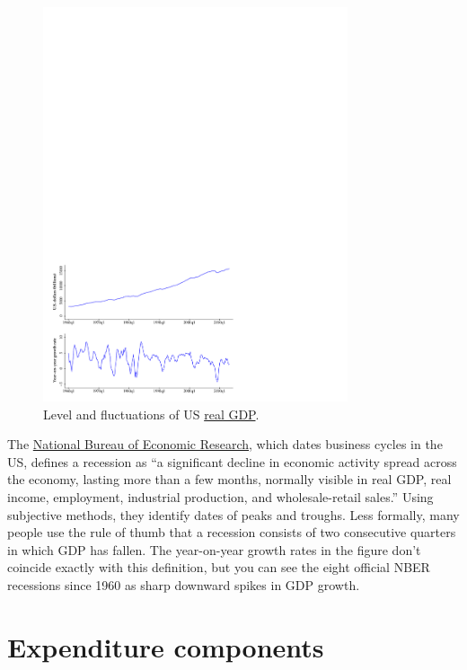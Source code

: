 \begin{figure}[h]
 \caption{Level and fluctuations of US \href{http://research.stlouisfed.org/fred2/series/GDPC1?cid=106}{real GDP}.}
    \label{fig:yandgy}
    \centering
    \includegraphics[width=0.8\textwidth]{Figures/us_gdp.pdf}
\end{figure}

The \href{http://www.nber.org/cycles/main.html}{National Bureau of Economic Research},
which dates business cycles in the US,
defines a recession  as ``a significant decline
in economic activity spread across the economy,
lasting more than a few months, normally visible in real GDP,
real income, employment, industrial production,
and wholesale-retail sales.''
Using subjective methods, they identify dates of peaks and troughs.
Less formally, many people use the rule of thumb
that a recession consists of two consecutive quarters
in which GDP has fallen.
The year-on-year growth rates in the figure don't coincide exactly
with this definition, but you can see the eight official NBER
recessions since 1960 as sharp downward spikes in GDP growth.


\section{Expenditure components}

